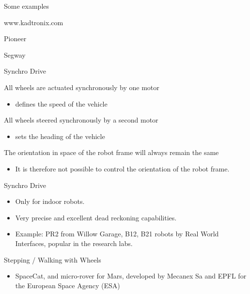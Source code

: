 \documentclass[compress]{beamer}
\begin{document}
\begin{frame}{Some examples}

www.kadtronix.com

Pioneer

Segway

\end{frame}

\begin{frame}{Synchro Drive}

All wheels are actuated synchronously by one motor

\begin{itemize}
    \item defines the speed of the vehicle
\end{itemize}

All wheels steered synchronously by a second motor

\begin{itemize}
    \item sets the heading of the vehicle
\end{itemize}

The orientation in space of the robot frame will always remain the same

\begin{itemize}
    \item It is therefore not possible to control the orientation of the robot
  frame.
\end{itemize}

\end{frame}

\begin{frame}{Synchro Drive}

\begin{itemize}
    \item Only for indoor robots.
    \item Very precise and excellent dead reckoning capabilities.
    \item Example: PR2 from Willow Garage, B12, B21 robots by Real World
  Interfaces, popular in the research labs.
\end{itemize}

\end{frame}

\begin{frame}{Stepping / Walking with Wheels}

\begin{itemize}
    \item SpaceCat, and micro-rover for Mars, developed by Mecanex Sa and EPFL
  for the European Space Agency (ESA)
\end{itemize}

\end{frame}
\end{document}
